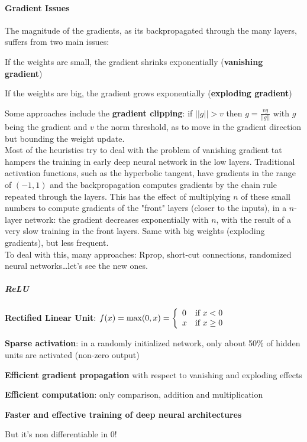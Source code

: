 \documentclass[10pt]{report}
\begin{document}
\paragraph{Gradient Issues} The magnitude of the gradients, as its backpropagated through the many layers, suffers from two main issues:
\begin{list}{}{}
	\item If the weights are small, the gradient shrinks exponentially (\textbf{vanishing gradient})
	\item If the weights are big, the gradient grows exponentially (\textbf{exploding gradient})
\end{list}
Some approaches include the \textbf{gradient clipping}: if $||g||> v$ then $g = \frac{vg}{||g||}$ with $g$ being the gradient and $v$ the norm threshold, as to move in the gradient direction but bounding the weight update.\\
Most of the heuristics try to deal with the problem of vanishing gradient tat hampers the training in early deep neural network in the low layers. Traditional activation functions, such as the hyperbolic tangent, have gradients in the range of $(-1,1)$ and the backpropagation computes gradients by the chain rule repeated through the layers. This has the effect of multiplying $n$ of these small numbers to compute gradients of the "front" layers (closer to the inputs), in a $n$-layer network: the gradient decreases exponentially with $n$, with the result of a very slow training in the front layers. Same with big weights (exploding gradients), but less frequent.\\
To deal with this, many approaches: Rprop, short-cut connections, randomized neural networks\ldots let's see the new ones.
\subparagraph{ReLU} \textbf{Rectified Linear Unit}: $f(x) = \hbox{max}(0,x) = \left\{\begin{array}{l l}
0&\hbox{if }x< 0\\
x&\hbox{if }x\geq 0\\
\end{array}\right.$
\begin{list}{}{}
	\item \textbf{Sparse activation}: in a randomly initialized network, only about 50\% of hidden units are activated (non-zero output)
	\item \textbf{Efficient gradient propagation} with respect to vanishing and exploding effects
	\item \textbf{Efficient computation}: only comparison, addition and multiplication
	\item \textbf{Faster and effective training of deep neural architectures}
	\item But it's non differentiable in 0!
\end{list}
\end{document}
